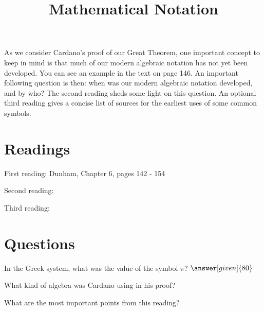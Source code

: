 \documentclass[nooutcomes]{ximera}
\title{Mathematical Notation}
\begin{document}
\begin{abstract}
    
\end{abstract}
\maketitle

As we consider Cardano's proof of our Great Theorem, one important concept to keep in mind is that much of our modern algebraic notation has not yet been developed.  You can see an example in the text on page 146.  An important following question is then: when was our modern algebraic notation developed, and by who?  The second reading sheds some light on this question.  An optional third reading gives a concise list of sources for the earliest uses of some common symbols.


\section{Readings}
First reading: Dunham, Chapter 6, pages 142 - 154

Second reading: 

Third reading: 

\section{Questions}

\begin{question}
In the Greek system, what was the value of the symbol $\pi$? $\answer[given]{80}$
\end{question}

\begin{question}
What kind of algebra was Cardano using in his proof?
\begin{multipleChoice}
\end{multipleChoice}
\end{question}


\begin{question}
What are the most important points from this reading?
\begin{freeResponse}
\end{freeResponse}

\end{question}
\end{document}
